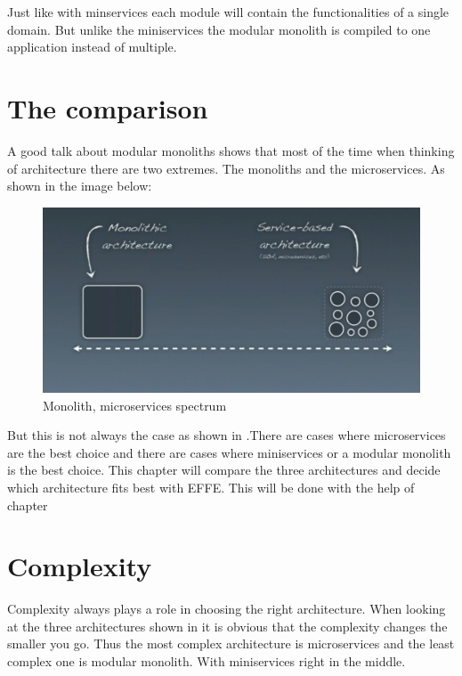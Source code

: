 Just like with minservices each module will contain the functionalities of a single domain. But unlike the miniservices the modular monolith is compiled to one application instead of multiple.

\section{The comparison}
\label{sec:Comparison}

A good talk about modular monoliths \cite{modularMonolithTalk} shows that most of the time when thinking of architecture there are two extremes. The monoliths and the microservices. As shown in the image below:
\begin{figure}[H]
	\includegraphics[width=\linewidth]{microservices-spectrum.png}
	\caption{Monolith, microservices spectrum \cite{modularMonolithTalk}}
\end{figure}

But this is not always the case as shown in .There are cases where microservices are the best choice and there are cases where miniservices or a modular monolith is the best choice. This chapter will compare the three architectures and decide which architecture fits best with EFFE. This will be done with the help of chapter 

\section{Complexity}
\label{sec:Complexity}

Complexity always plays a role in choosing the right architecture. When looking at the three architectures shown in  it is obvious that the complexity changes the smaller you go. Thus the most complex architecture is microservices and the least complex one is modular monolith. With miniservices right in the middle.

